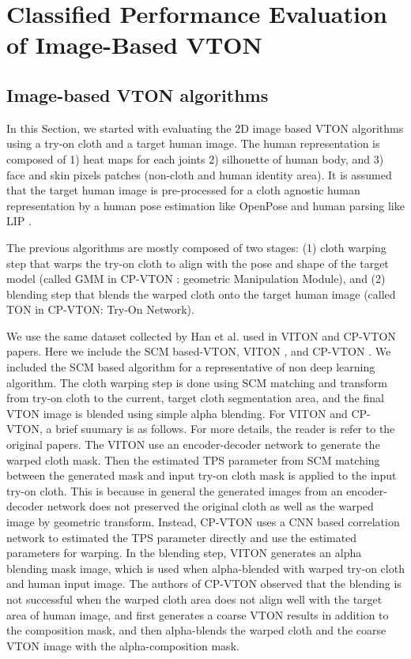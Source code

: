 
\section{Classified Performance Evaluation of Image-Based VTON}

\subsection{Image-based VTON algorithms}

In this Section, we started with evaluating the 2D image based VTON algorithms using a try-on cloth and a target human image. The human representation is composed of 1) heat maps for each joints 2) silhouette of human body, and 3) face and skin pixels patches (non-cloth and human identity area). It is assumed that the target human image is pre-processed for a cloth agnostic human representation by a human pose estimation like OpenPose\cite{Cao2018OpenPoseRM} and human parsing like LIP \cite{Liang2018LookIP}. 

The previous algorithms are mostly composed of two stages: (1) cloth warping step that warps the try-on cloth to align with the pose and shape of the target model (called GMM in CP-VTON \cite{Wang2018TowardCI}: geometric Manipulation Module), and (2) blending step that blends the warped cloth onto the target human image (called TON in CP-VTON: Try-On Network). 

We use the same dataset collected by Han et al. used in VITON\cite{Han2017VITONAI} and CP-VTON\cite{Wang2018TowardCI} papers. Here we include the SCM based-VTON, VITON \cite{Han2017VITONAI}, and  CP-VTON \cite{Wang2018TowardCI}. We included the SCM based algorithm  for a representative of non deep learning algorithm. The cloth warping step is done using SCM matching and transform from try-on cloth to the current, target cloth segmentation area, and the final VTON image is blended using simple alpha blending. For VITON and CP-VTON, a brief suumary is as follows. For more details, the reader is refer to the original papers.
The VITON use an encoder-decoder network to generate the warped cloth mask. Then the estimated TPS parameter from SCM matching between the generated mask and input try-on cloth mask is applied to the input try-on cloth. This is because in general the generated images from an encoder-decoder network does not preserved the original cloth as well as the warped image by geometric transform. Instead, CP-VTON uses a CNN based correlation network to estimated the TPS parameter directly and use the estimated parameters for warping.   
In the blending step, VITON generates an alpha blending mask image, which is used when alpha-blended with warped try-on cloth and human input image. The authors of CP-VTON observed that the blending is not successful when the warped  cloth area does not align well with the target area of human image, and first generates a coarse VTON results in addition to the composition mask, and then alpha-blends the warped cloth and the coarse VTON image with the alpha-composition mask.        


